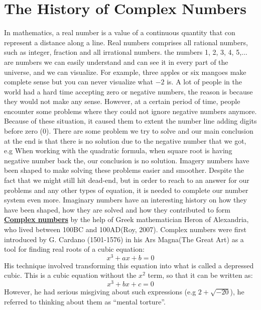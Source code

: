 \documentclass[11pt]{report}
\newcommand{\ubt}[1]{\textbf{\underline{#1}}}
\begin{document}
	\section{The History of Complex Numbers}
	In mathematics, a real number is a value of a continuous quantity that con represent a distance along a line. Real numbers comprises all rational numbers, such as integer, fraction and all irrational numbers. the numbers 1, 2, 3, 4, 5,$\ldots$ are numbers we can easily understand and can see it in every part of the universe, and we can visualize. For example, three apples or six mangoes make complete sense but you can never visualize what $-2$ is. A lot of people in the world had a hard time accepting zero or negative numbers, the reason is because they would not make any sense. However, at a certain period of time, people encounter some problems where they could not ignore negative numbers anymore. Because of these situation, it caused them to extent the number line adding digits before zero (0). There are some problem we try to solve and our main conclusion at the end is that there is no solution due to the negative number that we got, e.g When working with the quadratic formula, when square root is having negative number back the, our conclusion is no solution. Imagery numbers have been shaped to make solving these problems easier and smoother. Despite the fact that we might still hit dead-end, but in order to reach to an answer for our problems and any other types of equation, it is needed to complete our number system even more. Imaginary numbers have an interesting history on how they have been shaped, how they are solved and how they contributed to form \ubt{Complex numbers} by the help of Greek mathematician Heron of Alexandria, who lived between 100BC and 100AD(Roy, 2007). Complex numbers were first introduced by G. Cardano (1501-1576) in his Ars Magna(The Great Art) as a tool for finding real roots of a cubic equation:
	\begin{equation}
		x^3+ax+b=0\label{eq:1_1}
	\end{equation}
	His technique involved transforming this equation into what is called a depressed cubic. This is a cubic equation without the $x^2$ term, so that it can be written as:
	\begin{equation}
		x^3 +bx + c = 0\label{eq:1_2}
	\end{equation}
	However, he had serious misgiving about such expressions (e.g $2+\sqrt{-20}$), he referred to thinking about them as ``mental torture''.\\
	
\end{document}
